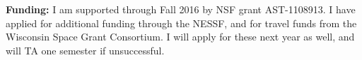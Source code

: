 \documentclass[iop]{emulateapj-rtx4}
\begin{document}
%
%
%
%
%
%
%
%
%
%


\noindent \textbf{Funding:}
I am supported through Fall 2016 by NSF grant AST-1108913. I have applied for additional funding through the NESSF, and for travel funds from the Wisconsin Space Grant Consortium. I will apply for these next year as well, and will TA one semester if unsuccessful.





%
%
%
%
%
%
%
%
%
%
%
%
%
%
%
%
%
%
%
%
%
%

\nocite{*}



\end{document}
